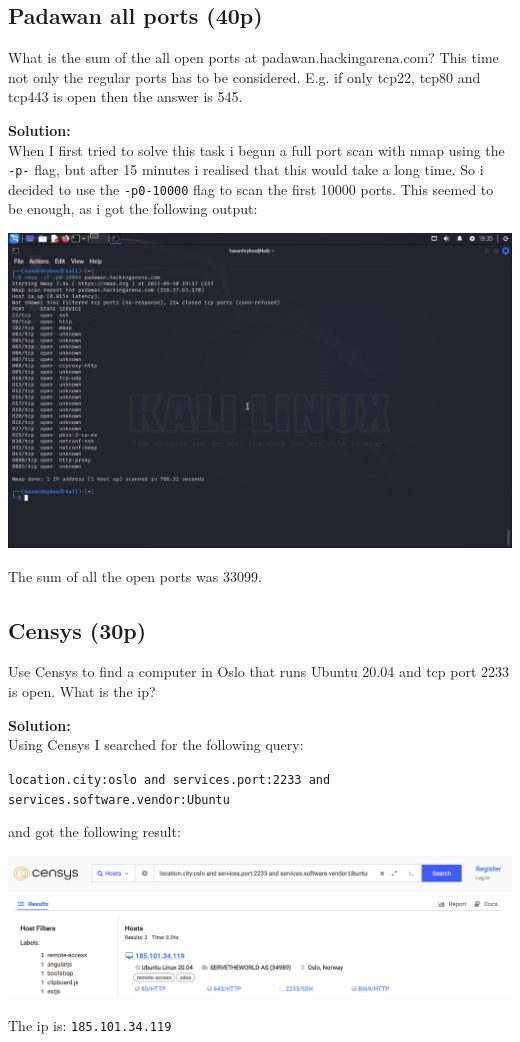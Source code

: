 \subsection{Padawan all ports (40p)}
What is the sum of the all open ports at padawan.hackingarena.com? This time not only the regular ports has to be considered. E.g. if only tcp22, tcp80 and tcp443 is open then the answer is 545.

\textbf{Solution:}\\
When I first tried to solve this task i begun a full port scan with nmap using the \texttt{-p-} flag, but after 15 minutes i realised that this would take a long time. So i decided to use the \texttt{-p0-10000} flag to scan the first 10000 ports. This seemed to be enough, as i got the following output:

\includegraphics[width=15cm]{img/Network mapping/Padawan all ports/Skjermbilde 2023-09-10 kl. 19.35.19.png}

The sum of all the open ports was 33099.

\subsection{Censys (30p)}
Use Censys to find a computer in Oslo that runs Ubuntu 20.04 and tcp port 2233 is open. What is the ip?

\textbf{Solution:}\\
Using Censys I searched for the following query:

\texttt{location.city:oslo and services.port:2233 and services.software.vendor:Ubuntu}

and got the following result:

\includegraphics[width=16cm]{img/Network mapping/Censys/Skjermbilde 2023-10-26 kl. 12.40.17.png}

The ip is: \texttt{185.101.34.119}